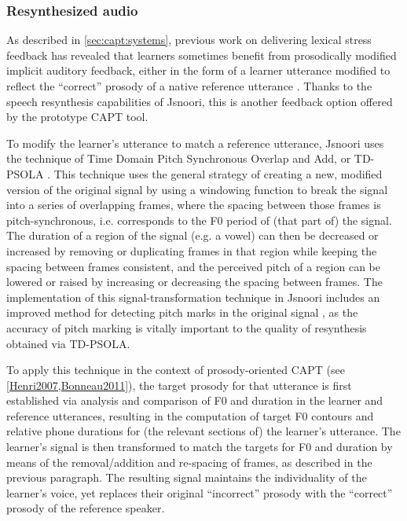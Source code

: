 			\subsubsection{Resynthesized audio}
			\label{sec:implicit:auditory:resynth}
			
			As described in \cref{sec:capt:systems}, previous work on delivering lexical stress feedback 
has revealed that learners sometimes benefit from prosodically modified implicit auditory feedback, either in the form of a learner utterance  modified to reflect the ``correct'' prosody of a native reference utterance \citep{Bonneau2011}.
			Thanks to the speech resynthesis capabilities of Jsnoori, this is another feedback option offered by the prototype CAPT tool.
			
			To modify the learner's utterance to match a reference utterance, Jsnoori uses the technique of Time Domain Pitch Synchronous Overlap and Add, or TD-PSOLA \citep{Moulines1990}. This technique uses the general strategy of creating a new, modified version of the original signal by using a windowing function to break the signal into a series of overlapping frames, where the spacing between those frames is pitch-synchronous, i.e. corresponds to the F0 period of (that part of) the signal. The duration of a region of the signal  (e.g. a vowel) can then be decreased or increased by removing or duplicating frames in that region while keeping the spacing between frames consistent, and  the perceived pitch of a region can be lowered or raised by increasing or decreasing the spacing between frames. The implementation of this signal-transformation technique in Jsnoori includes an improved method for detecting pitch marks in the original signal \citep{Laprie1998,Colotte2002}, as the accuracy of pitch marking is vitally important to the quality of resynthesis obtained via TD-PSOLA.
			
			To apply this technique in the context of prosody-oriented CAPT (see \cref{Henri2007,Bonneau2011}), the target prosody for that utterance is first established via analysis and comparison of F0 and duration in the learner and reference utterances, resulting in the computation of  target F0 contours and relative phone durations for (the relevant sections of) the learner's utterance. The learner's signal is then transformed to match the targets for F0 and duration by means of the removal/addition and re-spacing of frames, as described in the previous paragraph. The resulting signal maintains the individuality of the learner's voice, yet replaces their original ``incorrect'' prosody with the ``correct'' prosody of the reference speaker. 
			
